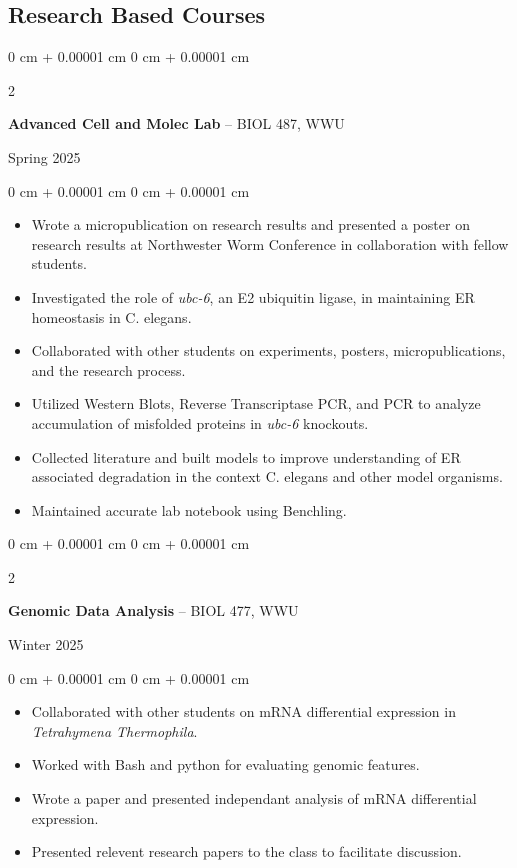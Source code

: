 \documentclass[10pt, article]{article}
\newenvironment{highlights}{
    \begin{itemize}[
        topsep=0.10 cm,
        parsep=0.10 cm,
        partopsep=0pt,
        itemsep=0pt,
        leftmargin=0 cm + 10pt
    ]
}{
    \end{itemize}
} %
\newenvironment{onecolentry}{
    \begin{adjustwidth}{
        0 cm + 0.00001 cm
    }{
        0 cm + 0.00001 cm
    }
}{
    \end{adjustwidth}
} %
\newenvironment{twocolentry}[2][]{
    \onecolentry
    \def\secondColumn{#2}
    \setcolumnwidth{\fill, 4.5 cm}
    \begin{paracol}{2}
}{
    \switchcolumn \raggedleft \secondColumn
    \end{paracol}
    \endonecolentry
} %
\begin{document}
    \begin{samepage}
    \section{Research Based Courses}

    \begin{twocolentry}
      {Spring 2025}
      \textbf{Advanced Cell and Molec Lab} -- BIOL 487, WWU
    \end{twocolentry}
      \begin{onecolentry}
        \begin{highlights}
        \item Wrote a micropublication on research results and presented a poster on research results at Northwester Worm Conference in collaboration with fellow students.
        \item Investigated the role of \textit{ubc-6}, an E2 ubiquitin ligase, in maintaining ER homeostasis in C. elegans. 
        \item Collaborated with other students on experiments, posters, micropublications, and the research process.
        \item Utilized Western Blots, Reverse Transcriptase PCR, and PCR to analyze accumulation of misfolded proteins in \textit{ubc-6} knockouts.
        \item Collected literature and built models to improve understanding of ER associated degradation in the context C. elegans and other model organisms.
        \item Maintained accurate lab notebook using Benchling.
        \end{highlights}
      \end{onecolentry}

    \begin{twocolentry}
      {Winter 2025}
       \textbf{Genomic Data Analysis} -- BIOL 477, WWU
    \end{twocolentry}
      \begin{onecolentry}
        \begin{highlights}
        \item Collaborated with other students on mRNA differential expression in \textit{Tetrahymena Thermophila}.
        \item Worked with Bash and python for evaluating genomic features.
        \item Wrote a paper and presented independant analysis of mRNA differential expression.
        \item Presented relevent research papers to the class to facilitate discussion.
        \end{highlights}
      \end{onecolentry}

    \end{samepage}
\end{document}
